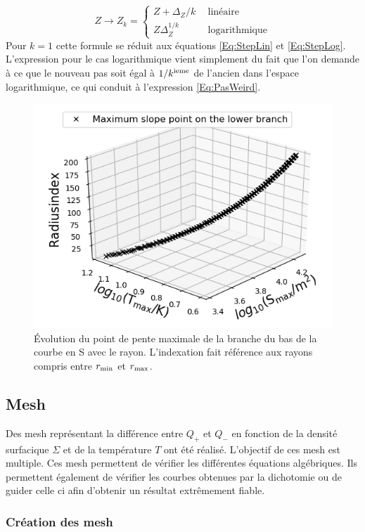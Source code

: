 \documentclass[a4paper,12pt]{article}
\begin{document}
            \begin{equation}
              Z \rightarrow Z_k = 
              \begin{cases}
                Z + \Delta_Z / k \ \ & \mbox{linéaire} \\
                \label{Eq:PasWeird}
                Z \Delta_Z ^{1/k} \ \ & \mbox{logarithmique}
              \end{cases}
            \end{equation}
            Pour $k=1$ cette formule se réduit aux équations \ref{Eq:StepLin} et \ref{Eq:StepLog}. L'expression pour le cas logarithmique vient simplement du fait que l'on demande à ce que le nouveau pas soit égal à $1/k^{\rm{ieme}}$ de l'ancien dans l'espace logarithmique, ce qui conduit à l'expression \ref{Eq:PasWeird}.
          
          
      \begin{figure}
        \centering
        \includegraphics[width=0.5\linewidth]{MaxSlopePoint}
        \caption{Évolution du point de pente maximale de la branche du bas de la courbe en S avec le rayon. L'indexation fait référence aux rayons compris entre $r_{\rm{min}}$ et $r_{\rm{max}}$.}
        \label{Fig:MaxSlope}
      \end{figure}    
      

\subsection{Mesh}
  \label{Sec:Mesh}

Des mesh représentant la différence entre $Q_+$ et $Q_-$ en fonction de la densité surfacique $\Sigma$ et de la température $T$ ont été réalisé. L'objectif de ces mesh est multiple. Ces mesh permettent de vérifier les différentes équations algébriques. Ils permettent également de vérifier les courbes obtenues par la dichotomie ou de guider celle ci afin d'obtenir un résultat extrêmement fiable.

\subsubsection{Création des mesh}
\end{document}
